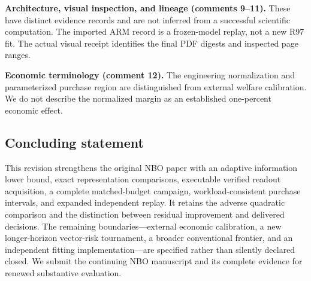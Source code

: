 \textbf{Architecture, visual inspection, and lineage (comments 9--11).}
These have distinct evidence records and are not inferred from a
successful scientific computation. The imported ARM record is a
frozen-model replay, not a new R97 fit. The actual visual receipt
identifies the final PDF digests and inspected page ranges.

\textbf{Economic terminology (comment 12).} The engineering
normalization and parameterized purchase region are distinguished from
external welfare calibration. We do not describe the normalized margin
as an established one-percent economic effect.

\hypertarget{concluding-statement}{%
\subsection{Concluding statement}\label{concluding-statement}}

This revision strengthens the original NBO paper with an adaptive
information lower bound, exact representation comparisons, executable
verified readout acquisition, a complete matched-budget campaign,
workload-consistent purchase intervals, and expanded independent replay.
It retains the adverse quadratic comparison and the distinction between
residual improvement and delivered decisions. The remaining
boundaries---external economic calibration, a new longer-horizon
vector-risk tournament, a broader conventional frontier, and an
independent fitting implementation---are specified rather than silently
declared closed. We submit the continuing NBO manuscript and its
complete evidence for renewed substantive evaluation.
